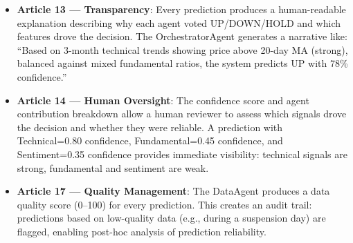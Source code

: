 \documentclass[conference]{IEEEtran}
\begin{document}
\begin{itemize}
\item \textbf{Article 13 — Transparency}: Every prediction produces a human-readable explanation describing why each agent voted UP/DOWN/HOLD and which features drove the decision. The OrchestratorAgent generates a narrative like: ``Based on 3-month technical trends showing price above 20-day MA (strong), balanced against mixed fundamental ratios, the system predicts UP with 78\% confidence.''

\item \textbf{Article 14 — Human Oversight}: The confidence score and agent contribution breakdown allow a human reviewer to assess which signals drove the decision and whether they were reliable. A prediction with Technical=0.80 confidence, Fundamental=0.45 confidence, and Sentiment=0.35 confidence provides immediate visibility: technical signals are strong, fundamental and sentiment are weak.

\item \textbf{Article 17 — Quality Management}: The DataAgent produces a data quality score (0--100) for every prediction. This creates an audit trail: predictions based on low-quality data (e.g., during a suspension day) are flagged, enabling post-hoc analysis of prediction reliability.
\end{itemize}
\end{document}
